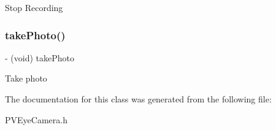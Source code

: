 Stop Recording \mbox{\label{interface_p_v_eye_camera_aeb99a8e6bc9f5a0e7a183305cc39b7fb}} 
\subsubsection{\texorpdfstring{take\+Photo()}{takePhoto()}}
{\footnotesize\ttfamily -\/ (void) take\+Photo \begin{DoxyParamCaption}{ }\end{DoxyParamCaption}}

Take photo 

The documentation for this class was generated from the following file\+:\begin{DoxyCompactItemize}
\item 
P\+V\+Eye\+Camera.\+h\end{DoxyCompactItemize}
